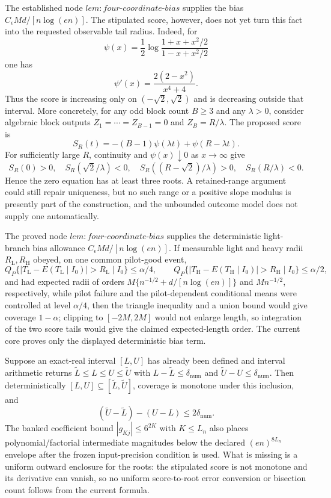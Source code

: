 The established node \(lem:four\text{-}coordinate\text{-}bias\) supplies the bias
\(C_\epsilon Md/[n\log(en)]\).  The stipulated score, however, does not yet
turn this fact into the requested observable tail radius.  Indeed, for
\[
 \psi(x)=\frac12\log\frac{1+x+x^2/2}{1-x+x^2/2}
\]
one has
\[
 \psi'(x)=\frac{2(2-x^2)}{x^4+4}.
\]
Thus the score is increasing only on \((-\sqrt2,\sqrt2)\) and is decreasing
outside that interval.  More concretely, for any odd block count \(B\ge3\)
and any \(\lambda>0\), consider algebraic block outputs
\(Z_1=\cdots=Z_{B-1}=0\) and \(Z_B=R/\lambda\).  The proposed score is
\[
 S_R(t)=-(B-1)\psi(\lambda t)+\psi(R-\lambda t).
\]
For sufficiently large \(R\), continuity and
\(\psi(x)\downarrow0\) as \(x\to\infty\) give
\[
 S_R(0)>0,\quad S_R(\sqrt2/\lambda)<0,\quad
 S_R((R-\sqrt2)/\lambda)>0,\quad S_R(R/\lambda)<0.
\]
Hence the zero equation has at least three roots.  A retained-range argument
could still repair uniqueness, but no such range or a positive slope modulus
is presently part of the construction, and the unbounded outcome model does
not supply one automatically.

The proved node \(lem:four\text{-}coordinate\text{-}bias\) supplies the
deterministic light-branch bias allowance
\(C_\epsilon Md/[n\log(en)]\).  If measurable light and heavy radii
\(R_{\mathrm L},R_{\mathrm H}\) obeyed, on one common pilot-good event,
\[
 Q_P\{|T_{\mathrm L}-E(T_{\mathrm L}\mid I_0)|>R_{\mathrm L}\mid I_0\}
 \le\alpha/4,
 \qquad
 Q_P\{|T_{\mathrm H}-E(T_{\mathrm H}\mid I_0)|>R_{\mathrm H}\mid I_0\}
 \le\alpha/2,
\]
and had expected radii of orders
\(M\{n^{-1/2}+d/[n\log(en)]\}\) and \(Mn^{-1/2}\), respectively, while
pilot failure and the pilot-dependent conditional means were controlled at
level \(\alpha/4\), then the triangle inequality and a union bound would give
coverage \(1-\alpha\); clipping to \([-2M,2M]\) would not enlarge length, so
integration of the two score tails would give the claimed expected-length
order.  The current core proves only the displayed deterministic bias term.

Suppose an exact-real interval \([L,U]\) has already been defined and interval
arithmetic returns \(\widetilde L\le L\le U\le\widetilde U\) with
\(L-\widetilde L\le\delta_{\mathrm{num}}\) and
\(\widetilde U-U\le\delta_{\mathrm{num}}\).  Then deterministically
\([L,U]\subseteq[\widetilde L,\widetilde U]\), coverage is monotone under
this inclusion, and
\[
 (\widetilde U-\widetilde L)-(U-L)\le2\delta_{\mathrm{num}}.
\]
The banked coefficient bound \(|g_{Kj}|\le6^{2K}\) with \(K\le L_n\) also
places polynomial/factorial intermediate magnitudes below the declared
\((en)^{8L_n}\) envelope after the frozen input-precision condition is used.
What is missing is a uniform outward enclosure for the roots: the stipulated
score is not monotone and its derivative can vanish, so no uniform
score-to-root error conversion or bisection count follows from the current
formula.
